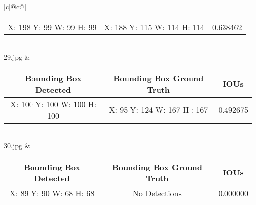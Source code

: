 \begin{center}
\begin{longtable}{|c|@{}c@{}|}
\begin{tabular}{c|c|c}
            X: 198 Y: 99 W: 99 H: 99 &
            X: 188 Y: 115 W: 114 H: 114 &
            0.638462
        \end{tabular}
        \\\hline
        29.jpg &
        \begin{tabular}{c|c|c}
            Bounding Box Detected & Bounding Box Ground Truth & IOUs\\\hline
            X: 100 Y: 100 W: 100 H: 100 &
            X: 95 Y: 124 W: 167 H : 167 &
            0.492675
        \end{tabular}
        \\\hline
        30.jpg &
        \begin{tabular}{c|c|c}
            Bounding Box Detected & Bounding Box Ground Truth & IOUs\\\hline
            X: 89 Y: 90 W: 68 H: 68 &
            No Detections & 
            0.000000
        \end{tabular}
        \hline
    \end{longtable}    
\end{center}